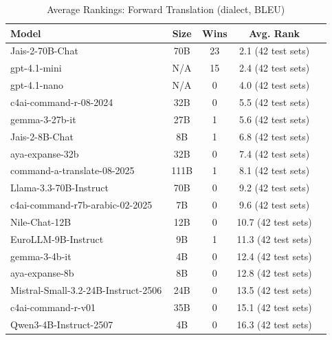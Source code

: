\begin{table}[htbp]
\centering
\caption{Average Rankings: Forward Translation (dialect, BLEU)}
\label{tab:avg_rankings_bleu_dialect}
\begin{tabular}{l@{\hspace{3pt}}c@{\hspace{3pt}}c@{\hspace{3pt}}c@{\hspace{3pt}}c}
\toprule
Model & Size & Wins & Avg. Rank \\
\midrule
Jais-2-70B-Chat & 70B & 23 & 2.1 (42 test sets) \\
gpt-4.1-mini & N/A & 15 & 2.4 (42 test sets) \\
gpt-4.1-nano & N/A & 0 & 4.0 (42 test sets) \\
c4ai-command-r-08-2024 & 32B & 0 & 5.5 (42 test sets) \\
gemma-3-27b-it & 27B & 1 & 5.6 (42 test sets) \\
Jais-2-8B-Chat & 8B & 1 & 6.8 (42 test sets) \\
aya-expanse-32b & 32B & 0 & 7.4 (42 test sets) \\
command-a-translate-08-2025 & 111B & 1 & 8.1 (42 test sets) \\
Llama-3.3-70B-Instruct & 70B & 0 & 9.2 (42 test sets) \\
c4ai-command-r7b-arabic-02-2025 & 7B & 0 & 9.6 (42 test sets) \\
Nile-Chat-12B & 12B & 0 & 10.7 (42 test sets) \\
EuroLLM-9B-Instruct & 9B & 1 & 11.3 (42 test sets) \\
gemma-3-4b-it & 4B & 0 & 12.4 (42 test sets) \\
aya-expanse-8b & 8B & 0 & 12.8 (42 test sets) \\
Mistral-Small-3.2-24B-Instruct-2506 & 24B & 0 & 13.5 (42 test sets) \\
c4ai-command-r-v01 & 35B & 0 & 15.1 (42 test sets) \\
Qwen3-4B-Instruct-2507 & 4B & 0 & 16.3 (42 test sets) \\
\bottomrule
\end{tabular}
\end{table}